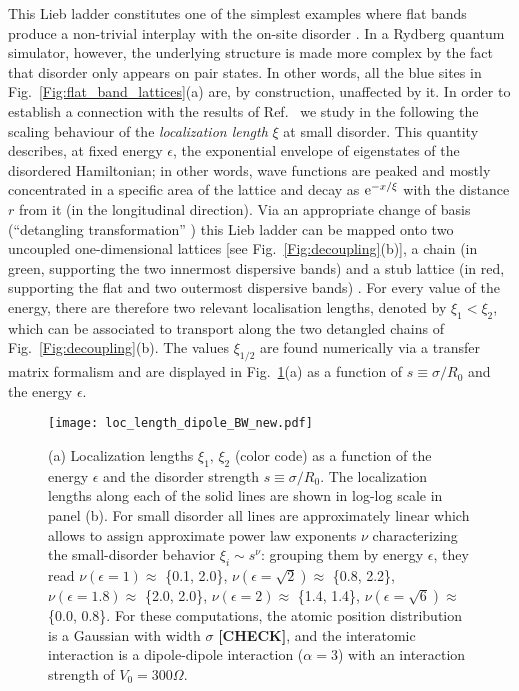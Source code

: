 \documentclass[prl,aps,twocolumn,showpacs,superscriptaddress,longbibliography]{revtex4-1}
\newcommand{\rme}[1]{{\rm{e}}^{#1}}
\begin{document}
This Lieb ladder constitutes one of the simplest examples where flat bands produce a non-trivial interplay with the on-site disorder \cite{Leykam2017}. In a Rydberg quantum simulator, however, the underlying structure is made more complex by the fact that disorder only appears on pair states. In other words, all the blue sites in Fig.~\ref{Fig:flat_band_lattices}(a) are, by construction, unaffected by it. In order to establish a connection with the results of Ref.~\cite{Leykam2017} we study in the following the scaling behaviour of the \emph{localization length} $\xi$ at small disorder. This quantity describes, at fixed energy $\epsilon$, the exponential envelope of eigenstates of the disordered Hamiltonian; in other words, wave functions are peaked and mostly concentrated in a specific area of the lattice and decay as $\rme{-x/\xi}$ with the distance $r$ from it (in the longitudinal direction).
%
Via an appropriate change of basis (``detangling transformation'' \cite{a_Flach_EPL_14,Leykam2017}) this Lieb ladder can be mapped onto two uncoupled one-dimensional lattices [see Fig.~\ref{Fig:decoupling}(b)], a chain (in green, supporting the two innermost dispersive bands) and a stub lattice (in red, supporting the flat and two outermost dispersive bands) \cite{SM}.
%
For every value of the energy, there are therefore two relevant localisation lengths, denoted by $\xi_1 < \xi_2$, which can be associated to transport along the two detangled chains of Fig.~\ref{Fig:decoupling}(b). The values $\xi_{1/2}$ are found numerically via a transfer matrix formalism and are displayed in Fig.~\ref{Fig:2D_loc_length}(a) as a function of $s \equiv \sigma / R_0$ and the energy $\epsilon$.
\begin{figure}
\texttt{[image: loc\_length\_dipole\_BW\_new.pdf]}
\caption{(a) Localization lengths $\xi_1,\,\xi_2$ (color code) as a function of the energy $\epsilon$ and the disorder strength $s \equiv \sigma / R_0$.
The localization lengths along each of the solid lines are shown in log-log scale in panel (b). For small disorder all lines are approximately linear which allows to assign approximate power law exponents $\nu$ characterizing the small-disorder behavior $\xi_i \sim s^\nu$: grouping them by energy $\epsilon$, they read $\nu\left(\epsilon = 1\right) \approx$ \{0.1, 2.0\}, $\nu\left(\epsilon = \sqrt{2}\right)\approx$ \{0.8, 2.2\}, $\nu\left(\epsilon = 1.8\right)\approx$ \{2.0, 2.0\}, $\nu\left(\epsilon = 2\right)\approx$ \{1.4, 1.4\}, $\nu\left(\epsilon = \sqrt{6}\right)\approx$ \{0.0, 0.8\}. For these computations, the atomic position distribution is a Gaussian with width $\sigma$ \textbf{[CHECK]}, and the interatomic interaction is a dipole-dipole interaction ($\alpha = 3$) with an interaction strength of $V_0 = 300\Omega$.}
 \label{Fig:2D_loc_length}
\end{figure}
\end{document}
